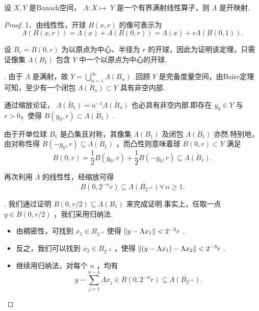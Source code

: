 \begin{theorem}[开映射定理]\label{thm:open-mapping}
设 $X,Y$ 是Banach空间， $\Lambda  : X \mapsto \; Y$ 是一个有界满射线性算子，则 $\Lambda$ 是开映射.
\end{theorem}

\begin{proof}
1．由线性性，开球 $B\left( {x,r}\right)$ 的像可表示为
\[
\Lambda \left( {B\left( {x,r}\right) }\right)  = \Lambda \left( x\right)  + \Lambda \left( {B\left( {0,r}\right) }\right)  = \Lambda \left( x\right)  + {r\Lambda }\left( {B\left( {0,1}\right) }\right) .
\]

设 ${B}_{r} \doteq  B\left( {0,r}\right)$ 为以原点为中心、半径为 $r$ 的开球，因此为证明该定理，只需证像集 $\Lambda \left( {B}_{1}\right)$ 包含 $Y$ 中一个以原点为中心的开球.

. 由于 $\Lambda$ 是满射，故 $Y = \mathop{\bigcup }\limits_{{n = 1}}^{\infty }\Lambda \left( {B}_{n}\right)$ .回顾 $Y$ 是完备度量空间，由Baire定理可知，至少有一个闭包 $\overline{\Lambda \left( {B}_{n}\right) } \subset  Y$ 具有非空内部.

通过缩放论证， $\overline{\Lambda \left( {B}_{1}\right) } = {n}^{-1}\overline{\Lambda \left( {B}_{n}\right) }$ 也必具有非空内部.即存在 ${y}_{0} \in  Y$ 与 $r > 0$，使得 $B\left( {{y}_{0},r}\right)  \subset  \overline{\Lambda \left( {B}_{1}\right) }$ .

由于开单位球 ${B}_{1}$ 是凸集且对称，其像集 $\Lambda \left( {B}_{1}\right)$ 及闭包 $\overline{\Lambda \left( {B}_{1}\right) }$ 亦然.特别地，由对称性得 $B\left( {-{y}_{0},r}\right)  \subseteq  \overline{\Lambda \left( {B}_{1}\right) }$ ，而凸性则意味着球 $B\left( {0,r}\right)  \subset  Y$ 满足
\[
B\left( {0,r}\right)  = \frac{1}{2}B\left( {{y}_{0},r}\right)  + \frac{1}{2}B\left( {-{y}_{0},r}\right)  \subseteq  \overline{\Lambda \left( {B}_{1}\right) }.
\]

再次利用 $\Lambda$ 的线性性，经缩放可得
\begin{equation}\tag{4.4}\label{eq:open-mapping-scaled-balls}
B\left( {0,{2}^{-n}r}\right)  \subseteq  \overline{\Lambda \left( {B}_{{2}^{-n}}\right) }\forall\,n \geq  1.
\end{equation}

. 我们通过证明 $B\left( {0,r/2}\right)  \subseteq  \Lambda \left( {B}_{1}\right)$ 来完成证明.事实上，任取一点 $y \in  B\left( {0,r/2}\right)$ ，我们采用归纳法.

\begin{itemize}
    \item 由稠密性，可找到 ${x}_{1} \in  {B}_{{2}^{-1}}$ 使得 $\norm{y - \Lambda {x}_{1}} < {2}^{-2}r$ .
    \item 反之，我们可以找到 ${x}_{2} \in  {B}_{{2}^{-2}}$ ，使得 $\norm{\left( {y - \Lambda {x}_{1}}\right)  - \Lambda {x}_{2}} < {2}^{-3}r$ .
    \item 继续用归纳法，对每个 $n$ ，均有\[
y - \mathop{\sum }\limits_{{j = 1}}^{{n - 1}}\Lambda {x}_{j} \in  B\left( {0,{2}^{-n}r}\right)  \subseteq  \overline{\Lambda \left( {B}_{{2}^{-n}}\right) }.
\]
\end{itemize}


\end{proof}
